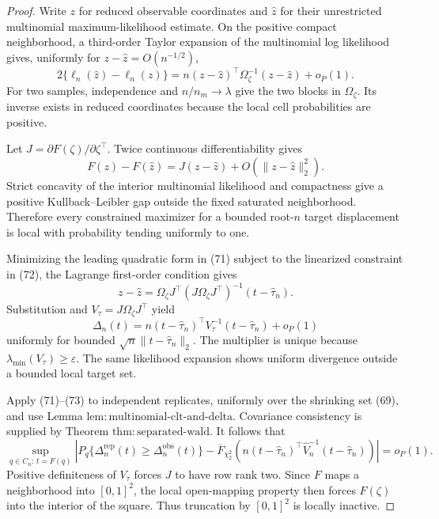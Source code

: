 \documentclass{article}
\begin{document}
\begin{proof}
Write \(z\) for reduced observable coordinates and \(\widehat z\) for their unrestricted multinomial maximum-likelihood estimate.  On the positive compact neighborhood, a third-order Taylor expansion of the multinomial log likelihood gives, uniformly for \(z-\widehat z=O(n^{-1/2})\),
\[
 2\{\ell_n(\widehat z)-\ell_n(z)\}
 =n(z-\widehat z)^{\top}\Omega_{\zeta}^{-1}
       (z-\widehat z)+o_P(1).                             \tag{71}
\]
For two samples, independence and \(n/n_m\to\lambda\) give the two blocks in \(\Omega_{\zeta}\).  Its inverse exists in reduced coordinates because the local cell probabilities are positive.

Let \(J=\partial F(\zeta)/\partial\zeta^{\top}\).  Twice continuous differentiability gives
\[
 F(z)-F(\widehat z)
 =J(z-\widehat z)+O(\|z-\widehat z\|_2^2).                \tag{72}
\]
Strict concavity of the interior multinomial likelihood and compactness give a positive Kullback--Leibler gap outside the fixed saturated neighborhood.  Therefore every constrained maximizer for a bounded root-\(n\) target displacement is local with probability tending uniformly to one.

Minimizing the leading quadratic form in (71) subject to the linearized constraint in (72), the Lagrange first-order condition gives
\[
 z-\widehat z
 =\Omega_{\zeta}J^{\top}
   (J\Omega_{\zeta}J^{\top})^{-1}(t-\widehat\tau_n).
\]
Substitution and \(V_{\tau}=J\Omega_{\zeta}J^{\top}\) yield
\[
 \Delta_n(t)
 =n(t-\widehat\tau_n)^{\top}V_{\tau}^{-1}
       (t-\widehat\tau_n)+o_P(1)                          \tag{73}
\]
uniformly for bounded \(\sqrt n\|t-\widehat\tau_n\|_2\).  The multiplier is unique because \(\lambda_{\min}(V_{\tau})\ge\varepsilon\).  The same likelihood expansion shows uniform divergence outside a bounded local target set.

Apply (71)--(73) to independent replicates, uniformly over the shrinking set (69), and use Lemma \(\mathrm{lem{:}multinomial\text{-}clt\text{-}and\text{-}delta}\).  Covariance consistency is supplied by Theorem \(\mathrm{thm{:}separated\text{-}wald}\).  It follows that
\[
 \sup_{q\in C_n:\,t=F(q)}
 \left|
 P_q\{\Delta_n^{\mathrm{rep}}(t)\ge\Delta_n^{\mathrm{obs}}(t)\}
 -\overline F_{\chi^2_2}\!\left(
 n(t-\widehat\tau_n)^{\top}\widehat V_n^{-1}
 (t-\widehat\tau_n)\right)
 \right|=o_P(1).                                          \tag{74}
\]
Positive definiteness of \(V_{\tau}\) forces \(J\) to have row rank two.  Since \(F\) maps a neighborhood into \([0,1]^2\), the local open-mapping property then forces \(F(\zeta)\) into the interior of the square.  Thus truncation by \([0,1]^2\) is locally inactive.


\end{proof}
\end{document}
